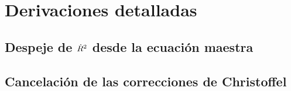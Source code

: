 \chapter{Derivaciones detalladas}
\label{ap:derivaciones}

\section{Despeje de $\dot{R}^2$ desde la ecuación maestra}

\section{Cancelación de las correcciones de Christoffel}
